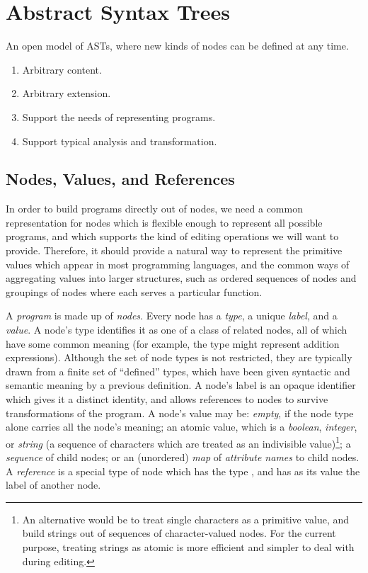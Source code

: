 \section{Abstract Syntax Trees}

An open model of ASTs, where new kinds of nodes can be defined at any time.
\begin{enumerate}
\item Arbitrary content.
\item Arbitrary extension.
\item Support the needs of representing programs.
\item Support typical analysis and transformation.
\end{enumerate}



\subsection{Nodes, Values, and References}
In order to build programs directly out of nodes, we need a common representation for nodes which is flexible enough to represent all possible programs, and which supports the kind of editing operations we will want to provide. Therefore, it should provide a natural way to represent the primitive values which appear in most programming languages, and the common ways of aggregating values into larger structures, such as ordered sequences of nodes and groupings of nodes where each serves a particular function.

A \emph{program} is made up of \emph{nodes}. Every node has a \emph{type}, a unique \emph{label}, and a \emph{value}. A node's type identifies it as one of a class of related nodes, all of which have some common meaning (for example, the type  might represent addition expressions). Although the set of node types is not restricted, they are typically drawn from a finite set of ``defined'' types, which have been given syntactic and semantic meaning by a previous definition. A node's label is an opaque identifier which gives it a distinct identity, and allows references to nodes to survive transformations of the program. A node's value may be: \emph{empty}, if the node type alone carries all the node's meaning; an atomic value, which is a \emph{boolean}, \emph{integer}, or \emph{string} (a sequence of characters which are treated as an indivisible value)\footnote{An alternative would be to treat single characters as a primitive value, and build strings out of sequences of character-valued nodes. For the current purpose, treating strings as atomic is more efficient and simpler to deal with during editing.}; a \emph{sequence} of child nodes; or an (unordered) \emph{map} of \emph{attribute names} to child nodes. A \emph{reference} is a special type of node which has the type , and has as its value the label of another node.

